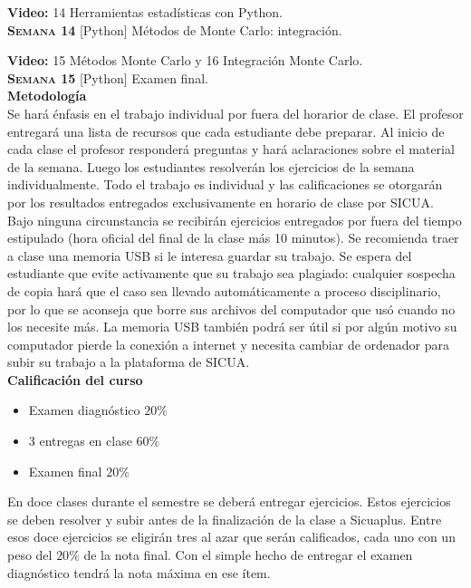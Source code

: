 \documentclass[letterpaper,10pt,onecolumn]{article}
\begin{document}
\textbf{Video:} 14 Herramientas estadísticas con Python.
\\[-0.3cm] 

\noindent\textbf{\textsc{Semana 14}} [Python] Métodos de Monte Carlo:
integración.

\textbf{Video:} 15 M\'etodos Monte Carlo y 16 Integraci\'on Monte Carlo.
\\[-0.3cm] 

\noindent\textbf{\textsc{Semana 15}} [Python] Examen final. \\[0.1cm] 

\noindent\textbf{\large {} \quad Metodología}\\[-0.2cm]

\noindent\normalsize Se har\'a \'enfasis en el trabajo individual por
fuera del horarior de clase. El profesor entregar\'a una lista de
recursos que cada estudiante debe preparar. 
Al inicio de cada clase el profesor responderá preguntas y 
hará aclaraciones sobre el material de la semana. Luego los
estudiantes resolverán los ejercicios de la semana individualmente. 
Todo el trabajo es individual y las calificaciones se otorgar\'an por
los resultados entregados exclusivamente en horario de clase por SICUA. 
Bajo ninguna circunstancia se recibirán ejercicios entregados por fuera 
del tiempo estipulado (hora oficial del final de la clase más 10 minutos).
Se recomienda traer a clase una memoria USB si le interesa guardar su 
trabajo. Se espera del estudiante que evite activamente que
su trabajo sea plagiado: cualquier sospecha de copia hará que el caso sea
llevado automáticamente a proceso disciplinario, por lo que se aconseja
que borre sus archivos del computador que usó cuando no los necesite más.
La memoria USB también podrá ser útil si por algún motivo su computador
pierde la conexión a internet y necesita cambiar de ordenador para subir
su trabajo a la plataforma de SICUA.
\\[0.1cm] 


\noindent\textbf{\large {} \quad Calificaci\'on del curso}\\[-0.2cm]

\begin{itemize}
	\item Examen diagnóstico $20\%$
	\item 3 entregas en clase $60\%$
	\item Examen final $20\%$
\end{itemize}
\noindent\normalsize En doce clases durante el semestre se deberá entregar 
ejercicios. Estos ejercicios se deben resolver y subir antes de la
finalizaci\'on de la clase a Sicuaplus. Entre esos doce ejercicios se 
eligirán tres al azar que serán calificados, cada uno con un peso del $20\%$
de la nota final. Con el simple hecho de entregar el examen diagnóstico
tendrá la nota máxima en ese ítem.
\\[0.1cm] 
\end{document}
